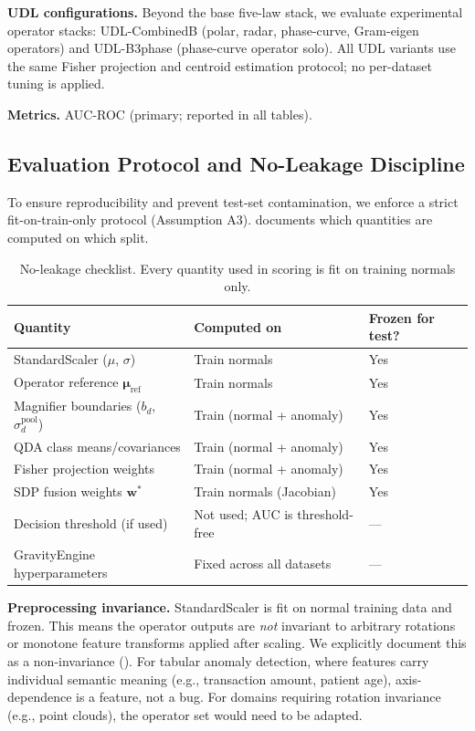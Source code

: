 \documentclass{article}
\begin{document}
\textbf{UDL configurations.} Beyond the base five-law stack, we evaluate experimental operator stacks: UDL-CombinedB (polar, radar, phase-curve, Gram-eigen operators) and UDL-B3phase (phase-curve operator solo). All UDL variants use the same Fisher projection and centroid estimation protocol; no per-dataset tuning is applied.

\textbf{Metrics.} AUC-ROC (primary; reported in all tables).

\subsection{Evaluation Protocol and No-Leakage Discipline}
\label{ssec:protocol}

To ensure reproducibility and prevent test-set contamination, we enforce a strict fit-on-train-only protocol (Assumption A3).  documents which quantities are computed on which split.

\begin{table}[t]
\centering
\caption{No-leakage checklist. Every quantity used in scoring is fit on training normals only.}
\label{tab:noleak}
\begin{tabular}{@{}lll@{}}
\toprule
\textbf{Quantity} & \textbf{Computed on} & \textbf{Frozen for test?} \\
\midrule
StandardScaler ($\mu$, $\sigma$) & Train normals & Yes \\
Operator reference $\bm{\mu}_{\text{ref}}$ & Train normals & Yes \\
Magnifier boundaries ($b_d$, $\sigma_d^{\text{pool}}$) & Train (normal + anomaly) & Yes \\
QDA class means/covariances & Train (normal + anomaly) & Yes \\
Fisher projection weights & Train (normal + anomaly) & Yes \\
SDP fusion weights $\mathbf{w}^*$ & Train normals (Jacobian) & Yes \\
Decision threshold (if used) & Not used; AUC is threshold-free & --- \\
GravityEngine hyperparameters & Fixed across all datasets & --- \\
\bottomrule
\end{tabular}
\end{table}

\textbf{Preprocessing invariance.} StandardScaler is fit on normal training data and frozen. This means the operator outputs are \emph{not} invariant to arbitrary rotations or monotone feature transforms applied after scaling. We explicitly document this as a non-invariance (). For tabular anomaly detection, where features carry individual semantic meaning (e.g., transaction amount, patient age), axis-dependence is a feature, not a bug. For domains requiring rotation invariance (e.g., point clouds), the operator set would need to be adapted.
\end{document}
